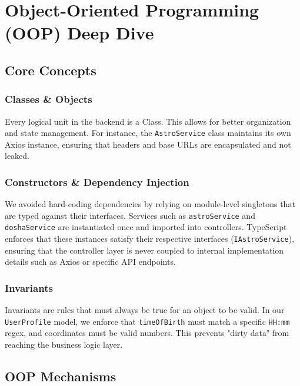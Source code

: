 \documentclass[12pt,a4paper]{article}
\begin{document}
\section{Object-Oriented Programming (OOP) Deep Dive}

\subsection{Core Concepts}

\subsubsection{Classes \& Objects}
Every logical unit in the backend is a Class. This allows for better organization and state management. For instance, the \texttt{AstroService} class maintains its own Axios instance, ensuring that headers and base URLs are encapsulated and not leaked.

\subsubsection{Constructors \& Dependency Injection}
We avoided hard-coding dependencies by relying on module-level singletons that are typed against their interfaces. Services such as \texttt{astroService} and \texttt{doshaService} are instantiated once and imported into controllers. TypeScript enforces that these instances satisfy their respective interfaces (\texttt{IAstroService}), ensuring that the controller layer is never coupled to internal implementation details such as Axios or specific API endpoints.

\subsubsection{Invariants}
Invariants are rules that must always be true for an object to be valid. In our \texttt{UserProfile} model, we enforce that \texttt{timeOfBirth} must match a specific \texttt{HH:mm} regex, and coordinates must be valid numbers. This prevents "dirty data" from reaching the business logic layer.

\subsection{OOP Mechanisms}
\end{document}
